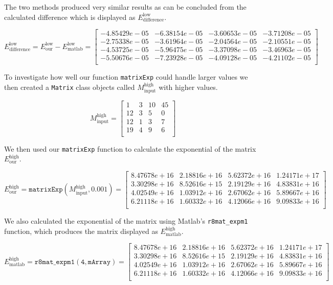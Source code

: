 \documentclass[paper=a4, fontsize=11pt]{article} %
\begin{document}
The two methods produced very similar results as can be concluded from
the calculated difference which is displayed as
$E_{\text{difference}}^{\text{low}}$.


\[
  E_{\text{difference}}^{\text{low}} = E_{\text{our}}^{\text{low}} - E_{\text{matlab}}^{\text{low}} =
  \begin{bmatrix}
    -4.85429e-05 & -6.38154e-05 & -3.60653e-05 & -3.71208e-05 \\
    -2.75338e-05 & -3.61964e-05 & -2.04564e-05 & -2.10551e-05 \\
    -4.53725e-05 & -5.96475e-05 & -3.37098e-05 & -3.46963e-05 \\
    -5.50676e-05 & -7.23928e-05 & -4.09128e-05 & -4.21102e-05 \\
  \end{bmatrix}
\]

To investigate how well our function \texttt{matrixExp} could handle
larger values we then created a \texttt{Matrix} class objects called
$M_{\text{input}}^{\text{high}}$ with higher values.

\[
M_{\text{input}}^{\text{high}}=
  \begin{bmatrix}
    1 & 3 & 10 & 45 \\
    12 & 3 & 5 & 0 \\
    12 & 1 & 3 & 7 \\
    19 & 4 & 9 & 6 \\
  \end{bmatrix}
\]

We then used our \texttt{matrixExp} function to calculate the
exponential of the matrix $E_{\text{our}}^{\text{high}}$.

\[
E_{\text{our}}^{\text{high}} = \mathtt{matrixExp}(M_{\text{input}}^{\text{high}},0.001) =
  \begin{bmatrix}
 8.47678e+16 & 2.18816e+16 & 5.62372e+16 & 1.24171e+17 \\
 3.30298e+16 & 8.52616e+15 & 2.19129e+16 & 4.83831e+16 \\
 4.02549e+16 & 1.03912e+16 & 2.67062e+16 & 5.89667e+16 \\
 6.21118e+16 & 1.60332e+16 & 4.12066e+16 & 9.09833e+16 \\
  \end{bmatrix}
\]

We also calculated the exponential of the matrix using Matlab's
\texttt{r8mat\_{expm1}} function, which produces the matrix displayed
as $E_{\text{matlab}}^{\text{high}}$.

\[
E_{\text{matlab}}^{\text{high}} = \mathtt{r8mat\_{expm1}(4, mArray)} =
  \begin{bmatrix}
 8.47678e+16 & 2.18816e+16 & 5.62372e+16 & 1.24171e+17 \\
 3.30298e+16 & 8.52616e+15 & 2.19129e+16 & 4.83831e+16 \\
 4.02549e+16 & 1.03912e+16 & 2.67062e+16 & 5.89667e+16 \\
 6.21118e+16 & 1.60332e+16 & 4.12066e+16 & 9.09833e+16 \\
  \end{bmatrix}
\]
\end{document}
